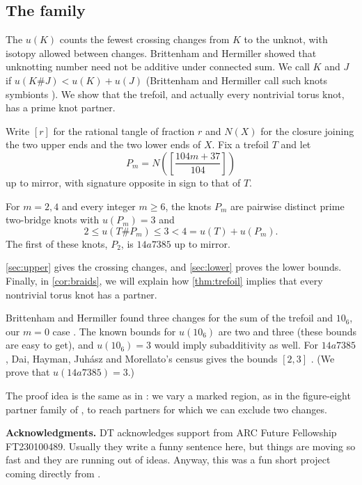 \documentclass[a4paper,11pt]{amsart}
\let\emph\relax
\numberwithin{equation}{subsection}
\theoremstyle{plain}
\theoremstyle{remark}
\begin{document}
\subsection{The family}\label{sec:main}

The \emph{unknotting number} $u(K)$ counts the fewest crossing changes from $K$ to the unknot, with isotopy allowed between changes. Brittenham and Hermiller \cite{BH-annals} showed that unknotting
number need not be additive under connected sum. We call $K$ and
$J$ \emph{partners} if $u(K\#J)<u(K)+u(J)$ (Brittenham and Hermiller call such knots symbionts \cite{BH-small}). We show that the trefoil, and actually every nontrivial torus knot, has a prime knot partner.

Write $[r]$ for the rational tangle of fraction $r$ and $N(X)$ for the closure joining the two upper ends and the two lower ends of $X$. Fix a trefoil $T$ and let
\[
P_m=N\!\left(\left[\frac{104m+37}{104}\right]\right)
\]
up to mirror, with signature opposite in sign to that of $T$.

\begin{Theorem}\label{thm:trefoil}
For $m=2,4$ and every integer $m\geq6$, the knots $P_m$ are pairwise distinct prime two-bridge knots with $u(P_m)=3$ and
\[
2\leq u(T\#P_m)\leq3<4=u(T)+u(P_m).
\]
The first of these knots, $P_2$, is $14a7385$ up to mirror.
\end{Theorem}

\autoref{sec:upper} gives the crossing changes, and \autoref{sec:lower} proves the lower bounds. Finally, in \autoref{cor:braids}, we will explain how \autoref{thm:trefoil} implies that every nontrivial torus knot has a partner.

\begin{Remark}
Brittenham and Hermiller found three changes for the sum of the trefoil and $10_6$, our $m=0$ case \cite{BH-small}. The known bounds for $u(10_6)$ are two and three (these bounds are easy to get), and $u(10_6)=3$ would imply subadditivity as well. For $14a7385$, Dai, Hayman, Juh\'asz and Morellato's census gives the bounds $[2,3]$ \cite[Section~5.4 and supporting data]{DHJM}. (We prove that $u(14a7385)=3$.)
\end{Remark}

The proof idea is the same as in \cite{DKT}:
we vary a marked region, as in the figure-eight partner family of \cite[Section~5D]{DKT}, to reach partners for which we can exclude two changes.
\smallskip

\noindent\textbf{Acknowledgments.}
DT acknowledges support from ARC Future Fellowship FT230100489. Usually they write a funny sentence here, but things are moving so fast and they are running out of ideas. Anyway, this was a fun short project coming directly from \cite{DKT}.
\smallskip
\end{document}
